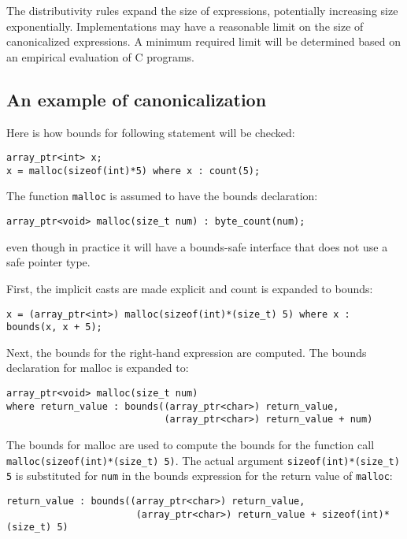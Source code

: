 The distributivity rules expand the size of expressions, potentially
increasing size exponentially. Implementations may have a reasonable
limit on the size of canonicalized expressions. A minimum required limit
will be determined based on an empirical evaluation of C programs.

\subsection{An example of canonicalization}\label{an-example-of-canonicalization}

Here is how bounds for following statement will be checked:
\begin{verbatim}
array_ptr<int> x;
x = malloc(sizeof(int)*5) where x : count(5);
\end{verbatim}

The function \verb+malloc+ is assumed to have the bounds declaration:

\begin{verbatim}
array_ptr<void> malloc(size_t num) : byte_count(num);
\end{verbatim}

even though in practice it will have a bounds-safe interface that does
not use a safe pointer type.

First, the implicit casts are made explicit and count is expanded to bounds:

\begin{verbatim}
x = (array_ptr<int>) malloc(sizeof(int)*(size_t) 5) where x : bounds(x, x + 5);
\end{verbatim}

Next, the bounds for the right-hand expression are computed. The bounds
declaration for malloc is expanded to:
\begin{verbatim}
array_ptr<void> malloc(size_t num)  
where return_value : bounds((array_ptr<char>) return_value, 
                            (array_ptr<char>) return_value + num)
\end{verbatim}

The bounds for malloc are used to compute the bounds for the function
call \verb+malloc(sizeof(int)*(size_t) 5)+. The actual argument
\verb+sizeof(int)*(size_t) 5+ is substituted for \verb+num+ in the
bounds expression for the return value of \verb+malloc+:
\begin{verbatim}
return_value : bounds((array_ptr<char>) return_value, 
                       (array_ptr<char>) return_value + sizeof(int)*(size_t) 5)
\end{verbatim}

